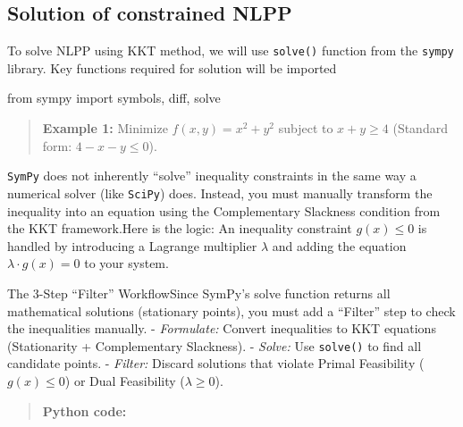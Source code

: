 \documentclass[
  letterpaper,
  DIV=11,
  numbers=noendperiod]{scrreprt}
\newenvironment{Shaded}{\begin{snugshade}}{\end{snugshade}}
\newcommand{\ImportTok}[1]{\textcolor[rgb]{0.00,0.46,0.62}{#1}}
\newcommand{\NormalTok}[1]{\textcolor[rgb]{0.00,0.23,0.31}{#1}}
\begin{document}
\subsection{Solution of constrained
NLPP}\label{solution-of-constrained-nlpp}

To solve NLPP using KKT method, we will use \texttt{solve()} function
from the \texttt{sympy} library. Key functions required for solution
will be imported

\begin{Shaded}
\begin{Highlighting}[]
\ImportTok{from}\NormalTok{ sympy }\ImportTok{import}\NormalTok{ symbols, diff, solve}
\end{Highlighting}
\end{Shaded}

\begin{quote}
\textbf{Example 1:} Minimize \(f(x, y) = x^2 + y^2\) subject to
\(x + y \ge 4\) (Standard form: \(4 - x - y \le 0\)).
\end{quote}

\texttt{SymPy} does not inherently ``solve'' inequality constraints in
the same way a numerical solver (like \texttt{SciPy}) does. Instead, you
must manually transform the inequality into an equation using the
Complementary Slackness condition from the KKT framework.Here is the
logic: An inequality constraint \(g(x) \le 0\) is handled by introducing
a Lagrange multiplier \(\lambda\) and adding the equation
\(\lambda \cdot g(x) = 0\) to your system.

The 3-Step ``Filter'' WorkflowSince SymPy's solve function returns all
mathematical solutions (stationary points), you must add a ``Filter''
step to check the inequalities manually. - \emph{Formulate:} Convert
inequalities to KKT equations (Stationarity + Complementary Slackness).
- \emph{Solve:} Use \texttt{solve()} to find all candidate points. -
\emph{Filter:} Discard solutions that violate Primal Feasibility
(\(g(x) \le 0\)) or Dual Feasibility (\(\lambda \ge 0\)).

\begin{quote}
\textbf{Python code:}
\end{quote}
\end{document}
